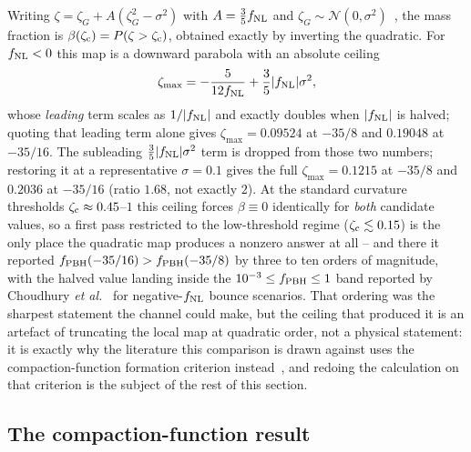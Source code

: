 \documentclass[aps,prd,twocolumn,superscriptaddress,nofootinbib,longbibliography]{revtex4-2}
\newcommand{\fnl}{f_{\rm NL}}
\newcommand{\fpbh}{f_{\rm PBH}}
\newcommand{\zetac}{\zeta_{\rm c}}
\begin{document}
Writing $\zeta = \zeta_G + A(\zeta_G^2 - \sigma^2)$ with $A = \tfrac{3}{5}\fnl$
and $\zeta_G \sim \mathcal{N}(0,\sigma^2)$~\cite{YoungByrnes2013,Franciolini2018},
the mass fraction is $\beta(\zetac) = P(\zeta > \zetac)$, obtained exactly by
inverting the quadratic. For $\fnl < 0$ this map is a downward parabola with an
absolute ceiling
\begin{equation}
  \zeta_{\max} = -\frac{5}{12 \fnl} + \frac{3}{5}|\fnl|\sigma^2 ,
  \label{eq:ceiling}
\end{equation}
whose \emph{leading} term scales as $1/|\fnl|$ and exactly doubles when
$|\fnl|$ is halved; quoting that leading term alone gives $\zeta_{\max} =
0.09524$ at $-35/8$ and $0.19048$ at $-35/16$. The subleading
$\tfrac{3}{5}|\fnl|\sigma^2$ term is dropped from those two numbers; restoring
it at a representative $\sigma=0.1$ gives the full $\zeta_{\max}=0.1215$ at
$-35/8$ and $0.2036$ at $-35/16$ (ratio $1.68$, not exactly $2$). At the standard curvature thresholds
$\zetac \approx 0.45$--$1$ this ceiling forces $\beta \equiv 0$ identically for
\emph{both} candidate values, so a first pass restricted to the low-threshold
regime ($\zetac \lesssim 0.15$) is the only place the quadratic map produces a
nonzero answer at all -- and there it reported $\fpbh(-35/16) > \fpbh(-35/8)$ by
three to ten orders of magnitude, with the halved value landing inside the
$10^{-3}\le\fpbh\le1$ band reported by Choudhury \textit{et
al.}~\cite{Choudhury2025} for negative-$\fnl$ bounce scenarios. That ordering
was the sharpest statement the
channel could make, but the ceiling that produced it is an artefact of
truncating the local map at quadratic order, not a physical statement: it is
exactly why the literature this comparison is drawn against uses the
compaction-function formation criterion instead~\cite{Choudhury2025}, and
redoing the calculation on that criterion is the subject of the rest of this section.

\subsection{The compaction-function result}
\label{sec:pbh_compaction}
\end{document}
